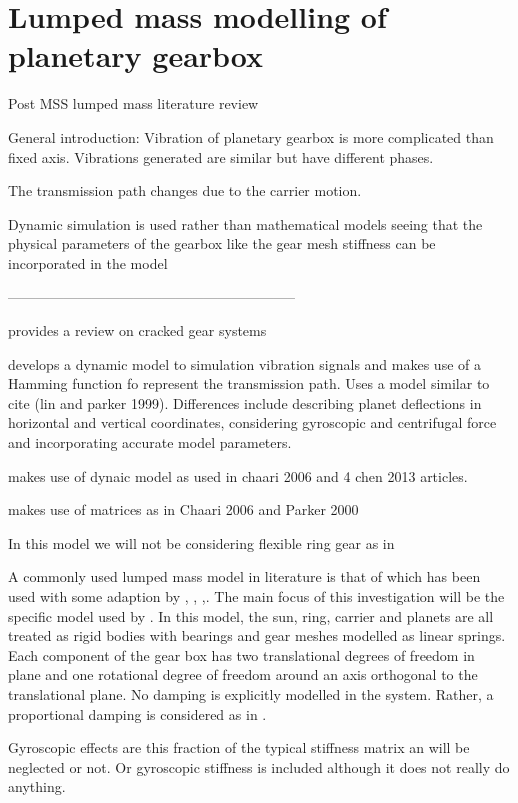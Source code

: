 \section{Lumped mass modelling of planetary gearbox}
Post MSS lumped mass literature review


General introduction:
Vibration of planetary gearbox is more complicated than fixed axis. Vibrations generated are similar but have different phases. 

The transmission path changes due to the carrier motion.

Dynamic simulation is used rather than mathematical models seeing that the physical parameters of the gearbox like the gear mesh stiffness can be incorporated in the model \cite{Liang2015}

--------------------------------------------------------------

\cite{Ma2015} provides a review on cracked gear systems

\cite{Liang2015} develops a dynamic model to simulation vibration signals and makes use of a Hamming function fo represent the transmission path. Uses a model similar to cite (lin and parker 1999). Differences include describing planet deflections in horizontal and vertical coordinates, considering gyroscopic and centrifugal force and incorporating accurate model parameters.

\cite{Chen 2015} makes use of dynaic model as used in chaari 2006  and 4 chen 2013 articles.

\cite{Chen2013} makes use of matrices as in Chaari 2006 and Parker 2000

In this model we will not be considering flexible ring gear as in \cite{Chen2015}


A commonly used lumped mass model in literature is that of \cite{Kahraman1994} which has been used with some adaption by  \cite{Lin1999}, \cite{Chaari2006}, \cite{Chen2013},\cite{Chen2015}. The main focus of this investigation will be the specific model used by \cite{Lin1999}. In this model, the sun, ring, carrier and planets are all treated as rigid bodies with bearings and gear meshes modelled as linear springs. Each component of the gear box has two translational degrees of freedom in plane and one rotational degree of freedom around an axis orthogonal to the translational plane. No damping is explicitly modelled in the system. Rather, a proportional damping is considered as in \cite{Chaari2006}.

Gyroscopic effects are this fraction of the typical stiffness matrix an will be neglected or not. Or gyroscopic stiffness is included although it does not really do anything. 

